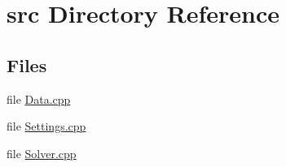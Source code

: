 \section{src Directory Reference}
\label{dir_68267d1309a1af8e8297ef4c3efbcdba}
\subsection*{Files}
\begin{DoxyCompactItemize}
\item 
file \hyperlink{Data_8cpp}{Data.\+cpp}
\item 
file \hyperlink{Settings_8cpp}{Settings.\+cpp}
\item 
file \hyperlink{Solver_8cpp}{Solver.\+cpp}
\end{DoxyCompactItemize}
